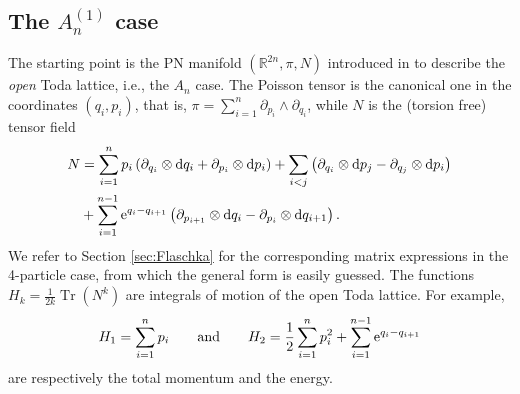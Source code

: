 \documentclass[12pt]{article}
\def\d{{\mathrm d}}
\def\Tr{\operatorname{Tr}}
\begin{document}
\subsection{The $A_n^{(1)}$ case} The starting point is the PN manifold $(\mathbb R^{2n},\pi,N)$ introduced in \cite{DO} to describe the \emph{open} Toda lattice, i.e., the $A_n$ case. 
The Poisson tensor is the canonical one in the coordinates $(q_i,p_i)$, that is, $\pi=\sum_{i=1}^n \partial_{p_i}\wedge\partial_{q_i}$,
while $N$ is the (torsion free) %
tensor field 
\begin{equation}
\label{N-openToda}
\begin{split}
N&=\sum_{i=1}^{n}p_i\left(\partial_{q_i}\otimes \d q_i+\partial_{p_i}\otimes \d p_i\right)+
\sum_{i<j}\left(\partial_{q_i}\otimes \d p_j-\partial_{q_j}\otimes \d p_i\right)\\
&+\sum_{i=1}^{n-1}{\rm e}^{q_i-q_{i+1}}\left(\partial_{p_{i+1}}\otimes \d q_i-\partial_{p_i}\otimes \d q_{i+1}\right).
\end{split}
\end{equation}
We refer to  Section \ref{sec:Flaschka} for the corresponding matrix expressions in the 4-particle case, from which the general form is easily guessed.
The functions $H_k=\frac1{2k}\Tr(N^k)$ are %
integrals of motion of the open Toda lattice. For example,
\begin{equation}
\label{traces-openToda}
H_1=\sum_{i=1}^{n}p_i\qquad\mbox{and}\qquad H_2=\frac12\sum_{i=1}^{n}p_i^2+\sum_{i=1}^{n-1}{\rm e}^{q_i-q_{i+1}}
\end{equation}
are respectively the total momentum and the energy.
\end{document}
